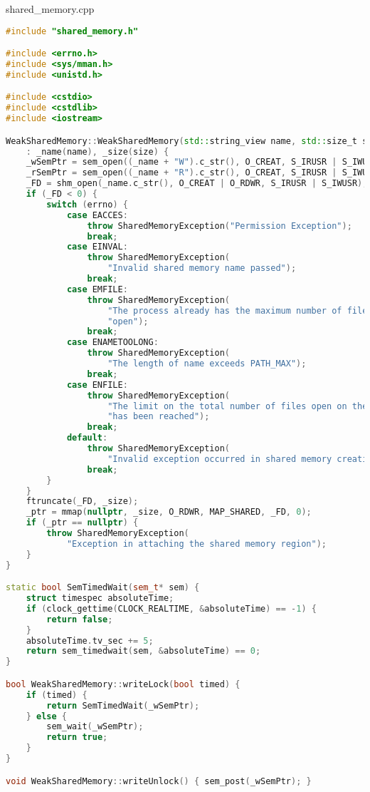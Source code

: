 \documentclass[a4paper, 12pt]{article}
\begin{document}
shared\_memory.cpp
\begin{lstlisting}[language=C++]
#include "shared_memory.h"

#include <errno.h>
#include <sys/mman.h>
#include <unistd.h>

#include <cstdio>
#include <cstdlib>
#include <iostream>

WeakSharedMemory::WeakSharedMemory(std::string_view name, std::size_t size)
    : _name(name), _size(size) {
    _wSemPtr = sem_open((_name + "W").c_str(), O_CREAT, S_IRUSR | S_IWUSR, 1);
    _rSemPtr = sem_open((_name + "R").c_str(), O_CREAT, S_IRUSR | S_IWUSR, 0);
    _FD = shm_open(_name.c_str(), O_CREAT | O_RDWR, S_IRUSR | S_IWUSR);
    if (_FD < 0) {
        switch (errno) {
            case EACCES:
                throw SharedMemoryException("Permission Exception");
                break;
            case EINVAL:
                throw SharedMemoryException(
                    "Invalid shared memory name passed");
                break;
            case EMFILE:
                throw SharedMemoryException(
                    "The process already has the maximum number of files "
                    "open");
                break;
            case ENAMETOOLONG:
                throw SharedMemoryException(
                    "The length of name exceeds PATH_MAX");
                break;
            case ENFILE:
                throw SharedMemoryException(
                    "The limit on the total number of files open on the system "
                    "has been reached");
                break;
            default:
                throw SharedMemoryException(
                    "Invalid exception occurred in shared memory creation");
                break;
        }
    }
    ftruncate(_FD, _size);
    _ptr = mmap(nullptr, _size, O_RDWR, MAP_SHARED, _FD, 0);
    if (_ptr == nullptr) {
        throw SharedMemoryException(
            "Exception in attaching the shared memory region");
    }
}

static bool SemTimedWait(sem_t* sem) {
    struct timespec absoluteTime;
    if (clock_gettime(CLOCK_REALTIME, &absoluteTime) == -1) {
        return false;
    }
    absoluteTime.tv_sec += 5;
    return sem_timedwait(sem, &absoluteTime) == 0;
}

bool WeakSharedMemory::writeLock(bool timed) {
    if (timed) {
        return SemTimedWait(_wSemPtr);
    } else {
        sem_wait(_wSemPtr);
        return true;
    }
}

void WeakSharedMemory::writeUnlock() { sem_post(_wSemPtr); }


\end{lstlisting}
\end{document}
